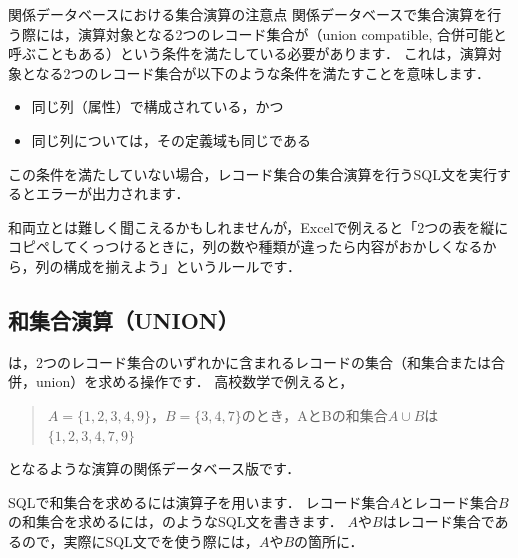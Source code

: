 \begin{notebox}{関係データベースにおける集合演算の注意点}
関係データベースで集合演算を行う際には，演算対象となる2つのレコード集合が（union compatible, 合併可能と呼ぶこともある）という条件を満たしている必要があります．
これは，演算対象となる2つのレコード集合が以下のような条件を満たすことを意味します．
\begin{itemize}
\item 同じ列（属性）で構成されている，かつ
\item 同じ列については，その定義域も同じである
\end{itemize}
この条件を満たしていない場合，レコード集合の集合演算を行うSQL文を実行するとエラーが出力されます．

和両立とは難しく聞こえるかもしれませんが，Excelで例えると「2つの表を縦にコピペしてくっつけるときに，列の数や種類が違ったら内容がおかしくなるから，列の構成を揃えよう」というルールです．
\end{notebox}


\subsection{和集合演算（UNION）}
は，2つのレコード集合のいずれかに含まれるレコードの集合（和集合または合併，union）を求める操作です．
高校数学で例えると，
\begin{quotation}
$A=\{1, 2, 3, 4, 9\}$，$B=\{3, 4, 7\}$のとき，AとBの和集合$A \cup B$は$\{1, 2, 3, 4, 7, 9\}$
\end{quotation}
となるような演算の関係データベース版です．

SQLで和集合を求めるには演算子を用います．
レコード集合$A$とレコード集合$B$の和集合を求めるには，のようなSQL文を書きます．
$A$や$B$はレコード集合であるので，実際にSQL文でを使う際には，$A$や$B$の箇所に．

